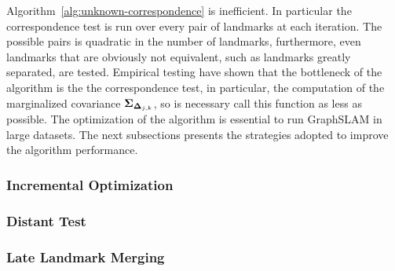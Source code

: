 Algorithm~\ref{alg:unknown-correspondence} is inefficient. In particular the correspondence test is run over every pair of landmarks at each iteration. The possible pairs is quadratic in the number of landmarks, furthermore, even landmarks that are obviously not equivalent, such as landmarks greatly separated, are tested. Empirical testing have shown that the bottleneck of the algorithm is the the correspondence test, in particular, the computation of the marginalized covariance $\boldsymbol{\Sigma}_{\boldsymbol{\Delta}_{j,k}}$, so is necessary call this function as less as possible. The optimization of the algorithm is essential to run GraphSLAM in large datasets. The next subsections presents the strategies adopted to improve the algorithm performance.

\subsubsection{Incremental Optimization}

\subsubsection{Distant Test}

\subsubsection{Late Landmark Merging}
